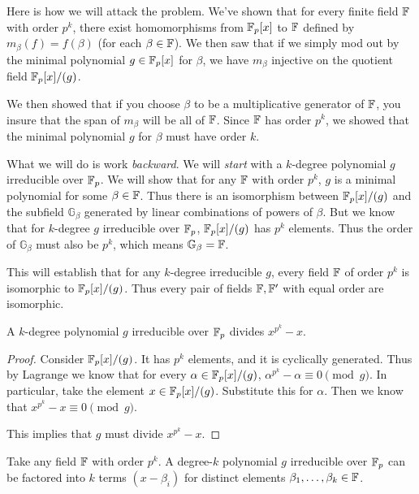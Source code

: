 \begin{remark}
  Here is how we will attack the problem. We've shown that for every
  finite field $\mathbb{F}$ with order $p^k$, there exist homomorphisms from
  $\mathbb{F}_p[x]$ to $\mathbb{F}$ defined by $m_\beta(f) = f(\beta)$ (for each $\beta
  \in \mathbb{F}$). We then saw that if we simply mod out by the minimal
  polynomial $g \in \mathbb{F}_p[x]$ for $\beta$, we have $m_\beta$ injective on
  the quotient field $\mathbb{F}_p[x]/(g)$.

  We then showed that if you choose $\beta$ to be a multiplicative
  generator of $\mathbb{F}$, you insure that the span of $m_\beta$ will be all
  of $\mathbb{F}$. Since $\mathbb{F}$ has order $p^k$, we showed that the minimal
  polynomial $g$ for $\beta$ must have order $k$.

  What we will do is work \emph{backward}. We will \emph{start} with a
  $k$-degree polynomial $g$ irreducible over $\mathbb{F}_p$. We will show that
  for any $\mathbb{F}$ with order $p^k$, $g$ is a minimal polynomial for some
  $\beta \in \mathbb{F}$. Thus there is an isomorphism between $\mathbb{F}_p[x]/(g)$ and the
  subfield $\mathbb{G}_\beta$ generated by linear combinations of powers
  of $\beta$. But we know that for $k$-degree $g$ irreducible over
  $\mathbb{F}_p$, $\mathbb{F}_p[x]/(g)$ has $p^k$ elements. Thus the order of
  $\mathbb{G}_\beta$ must also be $p^k$, which means $\mathbb{G}_\beta =
  \mathbb{F}$.

  This will establish that for any $k$-degree irreducible $g$, every
  field $\mathbb{F}$ of order $p^k$ is isomorphic to $\mathbb{F}_p[x]/(g)$. Thus every pair
  of fields $\mathbb{F}, \mathbb{F}'$ with equal order are isomorphic.
\end{remark}

\begin{lemma}
  A $k$-degree polynomial $g$ irreducible over $\mathbb{F}_p$ divides $x^{p^k} -
  x$.
\end{lemma}

\begin{proof}
  Consider $\mathbb{F}_p[x]/(g)$. It has $p^k$ elements, and it is cyclically
  generated. Thus by Lagrange we know that for every $\alpha \in
  \mathbb{F}_p[x]/(g)$, $\alpha^{p^k} - \alpha \equiv 0 \pmod g$. In particular, take
  the element $x \in \mathbb{F}_p[x]/(g)$. Substitute this for $\alpha$. Then we know
  that $x^{p^k} - x \equiv 0 \pmod g$.

  This implies that $g$ must divide $x^{p^k} - x$.
\end{proof}

\begin{lemma}
  Take any field $\mathbb{F}$ with order $p^k$. A degree-$k$ polynomial $g$
  irreducible over $\mathbb{F}_p$ can be factored into $k$ terms $(x - \beta_i)$
  for distinct elements $\beta_1, \ldots, \beta_k \in \mathbb{F}$.
\end{lemma}

